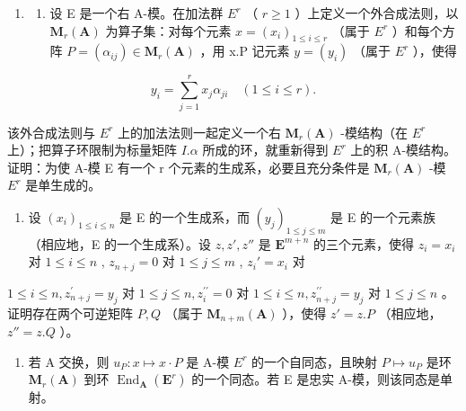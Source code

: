 \BourbakiExercisesSection

\begin{enumerate}
\def\labelenumi{\arabic{enumi}.}
\tightlist
\item
  \begin{enumerate}
  \def\labelenumii{(\alph{enumii})}
  \tightlist
  \item
    设 E 是一个右 A-模。在加法群 \(E^{r}\) （ \(r \geqslant 1\) ）上定义一个外合成法则，以 \(\mathbf{M}_{r}(\mathbf{A})\) 为算子集：对每个元素 \(x = (x_{i})_{1 \leqslant i \leqslant r}\) （属于 \(E^{r}\) ）和每个方阵 \(P = (\alpha_{ij}) \in \mathbf{M}_{r}(\mathbf{A})\) ，用 x.P 记元素 \(y = (y_{i})\) （属于 \(E^{r}\) ），使得
  \end{enumerate}
\end{enumerate}

\[
y _ {i} = \sum_ {j = 1} ^ {r} x _ {j} \alpha_ {j i} \quad (1 \leqslant i \leqslant r).
\]

该外合成法则与 \(E^{r}\) 上的加法法则一起定义一个右 \(\mathbf{M}_{r}(\mathbf{A})\) -模结构（在 \(E^{r}\) 上）；把算子环限制为标量矩阵 \(I.\alpha\) 所成的环，就重新得到 \(E^{r}\) 上的积 A-模结构。证明：为使 A-模 E 有一个 r 个元素的生成系，必要且充分条件是 \(\mathbf{M}_{r}(\mathbf{A})\) -模 \(E^{r}\) 是单生成的。

\begin{enumerate}
\def\labelenumi{(\alph{enumi})}
\setcounter{enumi}{1}
\tightlist
\item
  设 \((x_{i})_{1\leqslant i\leqslant n}\) 是 E 的一个生成系，而 \((y_{j})_{1\leqslant j\leqslant m}\) 是 E 的一个元素族（相应地，E 的一个生成系）。设 \(z, z', z''\) 是 \(\mathbf{E}^{m + n}\) 的三个元素，使得 \(z_{i} = x_{i}\) 对 \(1\leqslant i\leqslant n\) , \(z_{n + j} = 0\) 对 \(1\leqslant j\leqslant m\) , \(z_{i}' = x_{i}\) 对
\end{enumerate}

\(1 \leqslant i \leqslant n, z_{n+j}^{\prime} = y_{j}\) 对 \(1 \leqslant j \leqslant n, z_{i}^{\prime \prime} = 0\) 对 \(1 \leqslant i \leqslant n, z_{n+j}^{\prime \prime} = y_{j}\) 对 \(1 \leqslant j \leqslant n\) 。证明存在两个可逆矩阵 \(P, Q\) （属于 \(\mathbf{M}_{n+m}(\mathbf{A})\) ），使得 \(z' = z.P\) （相应地， \(z'' = z.Q\) ）。

\begin{enumerate}
\def\labelenumi{(\alph{enumi})}
\setcounter{enumi}{2}
\tightlist
\item
  若 A 交换，则 \(u_{P}: x \mapsto x \cdot P\) 是 A-模 \(E^{r}\) 的一个自同态，且映射 \(P \mapsto u_{P}\) 是环 \(\mathbf{M}_{r}(\mathbf{A})\) 到环 \(\operatorname{End}_{\mathbf{A}}(\mathbf{E}^{r})\) 的一个同态。若 E 是忠实 A-模，则该同态是单射。
\end{enumerate}

